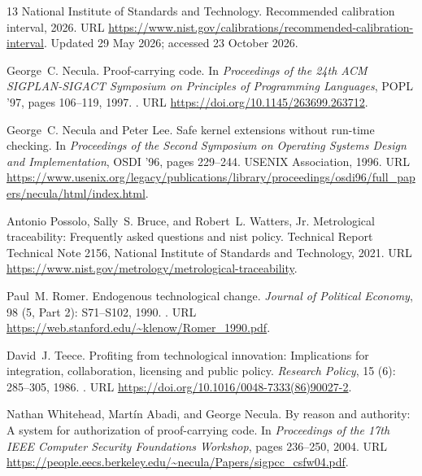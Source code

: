 \begin{thebibliography}{13}
{National Institute of Standards and Technology}.
\newblock Recommended calibration interval, 2026.
\newblock URL
  \url{https://www.nist.gov/calibrations/recommended-calibration-interval}.
\newblock Updated 29 May 2026; accessed 23 October 2026.

George~C. Necula.
\newblock Proof-carrying code.
\newblock In \emph{Proceedings of the 24th ACM SIGPLAN-SIGACT Symposium on
  Principles of Programming Languages}, POPL '97, pages 106--119, 1997.
\newblock {}.
\newblock URL \url{https://doi.org/10.1145/263699.263712}.

George~C. Necula and Peter Lee.
\newblock Safe kernel extensions without run-time checking.
\newblock In \emph{Proceedings of the Second Symposium on Operating Systems
  Design and Implementation}, OSDI '96, pages 229--244. USENIX Association,
  1996.
\newblock URL
  \url{https://www.usenix.org/legacy/publications/library/proceedings/osdi96/full_papers/necula/html/index.html}.

Antonio Possolo, Sally~S. Bruce, and Robert~L. Watters, Jr.
\newblock Metrological traceability: Frequently asked questions and nist
  policy.
\newblock Technical Report Technical Note 2156, National Institute of Standards
  and Technology, 2021.
\newblock URL \url{https://www.nist.gov/metrology/metrological-traceability}.

Paul~M. Romer.
\newblock Endogenous technological change.
\newblock \emph{Journal of Political Economy}, 98 (5, Part
  2): S71--S102, 1990.
\newblock {}.
\newblock URL \url{https://web.stanford.edu/~klenow/Romer_1990.pdf}.

David~J. Teece.
\newblock Profiting from technological innovation: Implications for
  integration, collaboration, licensing and public policy.
\newblock \emph{Research Policy}, 15 (6): 285--305, 1986.
\newblock {}.
\newblock URL \url{https://doi.org/10.1016/0048-7333(86)90027-2}.

Nathan Whitehead, Mart{\'i}n Abadi, and George Necula.
\newblock By reason and authority: A system for authorization of proof-carrying
  code.
\newblock In \emph{Proceedings of the 17th IEEE Computer Security Foundations
  Workshop}, pages 236--250, 2004.
\newblock URL
  \url{https://people.eecs.berkeley.edu/~necula/Papers/sigpcc_csfw04.pdf}.

\end{thebibliography}


